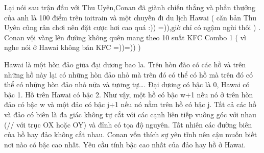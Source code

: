 Lại nói sau trận đấu với Thu Uyên,Conan đã giành chiến thắng và phần thưởng của anh là 100 điểm trên ioitrain và một chuyến đi du lịch Hawai ( căn bản Thu Uyên cũng rân chơi nên đặt cược hơi cao quá :)) =)),giờ chỉ có ngậm ngùi thôi ) . Conan vội vàng lên đường không quên mang theo 10 suất KFC Combo 1 ( vì nghe nói ở Hawai không bán KFC =))=)) )  

   Hawai là một hòn đảo giữa đại dương bao la. Trên hòn đào có các hồ và trên những hồ này lại có những hòn đảo nhỏ mà trên đó có thể có hồ mà trên đó có thể có những hòn đảo nhỏ nữa và tương tự…. Đại dương có bậc là 0, Hawai có bậc 1. Hồ trên Hawai có bậc 2. Như vậy, một hồ có bậc w+1 nếu nó ở trên hòn đảo có bậc w và một đảo có bậc j+1 nếu nó nằm trên hồ có bậc j. Tất cả các hồ và đảo có biên là đa giác không tự cắt với các cạnh liên tiếp vuông góc với nhau (// với trục OX hoặc OY) và đỉnh có tọa độ nguyên. Tất nhiên các đường biên của hồ hay đảo không cắt nhau. Conan vốn thích sự yên tĩnh nên cậu muốn biết nơi nào có bậc cao nhất. Yêu cầu tính bậc cao nhất của đảo hay hồ ở Hawai.